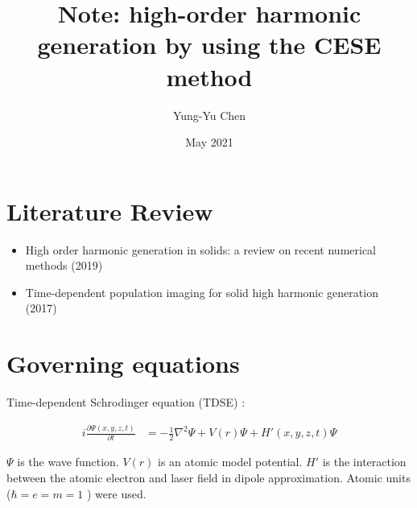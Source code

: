 \documentclass{isildur}
\title{
%
Note: high-order harmonic generation by using the CESE method
%
}
\author{
%
Yung-Yu Chen
%
}
\date{May 2021}
\begin{document}
\maketitle

\tableofcontents

\chapter{Literature Review}
\label{c:review}

\begin{itemize}
  \item High order harmonic generation in solids: a review on recent numerical
  methods (2019) \cite{yu_high_2019}
  \item Time-dependent population imaging for solid high harmonic generation
  (2017) \cite{liu_time-dependent_2017}
\end{itemize}

\chapter{Governing equations}
\label{c:goveq}

Time-dependent Schrodinger equation (TDSE) \cite{briggs_derivation_2007}:

\begin{align}
  i\frac{\partial \Psi(x, y, z, t)}{\partial t}
  &= -\frac{1}{2}\nabla^2\Psi + V(r)\Psi + H'(x, y, z, t)\Psi
\end{align}

$\Psi$ is the wave function.  $V(r)$ is an atomic model potential.  $H'$ is the
interaction between the atomic electron and laser field in dipole
approximation. Atomic units ($\hbar=e=m=1$ ) were used.

\clearpage
{}


\end{document}
